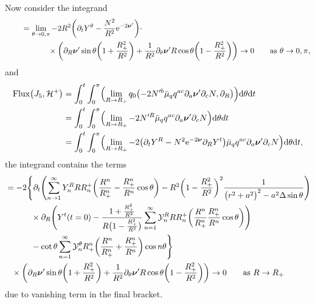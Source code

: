 \documentclass[pdftex]{sigma}
\def\ptl{\partial}%
\def\mbo#1{\boldsymbol{#1}}%
\numberwithin{equation}{section}
\begin{document}
Now consider the integrand
\begin{align*}
\qquad&{}= \lim_{\theta \to 0, \pi}-2 R^2 \biggl(\ptl_ t Y^\theta - \frac{N^2}{R^2} {\rm e}^{-2 \mbo{\nu}'} \biggr) \cdot \notag\\
&\hphantom{= \lim_{\theta \to 0, \pi}}{} \times \biggl( \ptl_R \mbo{\nu}' \sin \theta \biggl(1 + \frac{R^2_+}{R^2}\biggr) + \frac{1}{R^2} \ptl_ \theta \mbo{\nu}' R \cos \theta \biggl(1- \frac{R^2_+}{R^2}\biggr) \biggr)
 \to 0 \qquad \text{as} \ \theta \to 0, \pi,
\end{align*}
and
\begin{align*}
{\rm Flux} \bigl(J_5, \mathcal{H}^+\bigr) &{}= \int^t_0 \int^\pi _0 \Bigl(\lim_{R \to R_+} q_0 \bigl(-2N'^b \bar{\mu}_q q^{ac} \ptl_a \mbo{\nu}' \ptl_c N, \ptl_R\bigr) \Bigr) {\rm d}\theta {\rm d}t \notag \\
&{}= \int^t_0 \int^\pi _0 \Bigl(\lim_{R \to R_+} - 2 N'^R \bar{\mu}_q q^{ac} \ptl_a \mbo{\nu}' \ptl_c N \Bigr) {\rm d}\theta d t \notag \\
&{}= \int^t_0 \int^\pi_0 \Bigl( \lim_{R \to R_+} -2\bigl(\ptl_t Y^R - N^2 {\rm e}^{-2 \mbo{\nu}} \ptl_R Y^t\bigr) \bar{\mu}_q q^{ac} \ptl_a \mbo{\nu}' \ptl_c N \Bigr) {\rm d}\theta {\rm d}t,
\end{align*}
the integrand contains the terms
\begin{align*}
&
=- 2 \Biggl\{ \ptl_t \Biggl(\sum^\infty_{n \to 1} Y^R_n R R^+_n \biggl(\frac{R^n}{R^n_+}- \frac{R_+^n}{R^n} \cos \theta\biggr) - R^2 \biggl(1- \frac{R^2_+}{R^2}\biggr)^2 \frac{1}{ \bigl(r^2 +a^2\bigr)^2 - a^2 \Delta \sin \theta} \Biggr) \notag\\
&\hphantom{=- 2 \Biggl\{}{}
\times\ptl_R \Biggl(Y^t(t=0)- \frac{1+ \frac{R^2_+}{R^2}}{R \bigl(1- \frac{R_+^2}{R^2}\bigr)} \sum^\infty_{n = 1} \mathcal{Y}^R_n R R^+_n \biggl(\frac{R^n}{R^n_+} \frac{R_+^n}{R^n} \cos \theta \biggr) \Biggr) \notag \\
&\hphantom{=- 2 \Biggl\{}{}
- \cot \theta \sum^\infty_{n=1} \mathcal{Y}_n^\theta R^n_+\biggl(\frac{R^n}{R^n_+} + \frac{R^n_+}{R^n} \biggr) \cos n\theta \Biggr\} \notag\\
&\hphantom{=}{}
 \times \biggl(\ptl_R \mbo{\nu}' \sin \theta \biggl(1 + \frac{R^2_+}{R^2}\biggr) + \frac{1}{R^2} \ptl_\theta \mbo{\nu}' R \cos \theta \biggl(1- \frac{R^2_+}{R^2}\biggr) \biggr)
 \to 0 \qquad \text{as} \ R \to R_+
\end{align*}
due to vanishing term in the final bracket.
\end{document}
